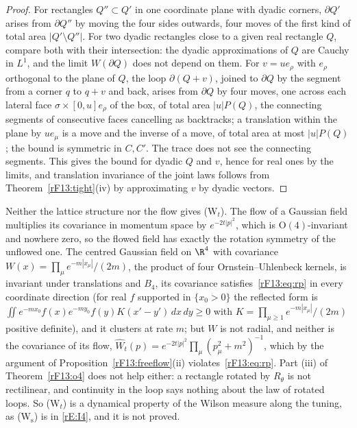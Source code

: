 \begin{proof}
For rectangles $Q''\subset Q'$ in one coordinate plane with dyadic corners,
$\partial Q'$ arises from $\partial Q''$ by moving the four sides outwards,
four moves of the first kind of total area $|Q'\setminus Q''|$. For two
dyadic rectangles close to a given real rectangle $Q$, compare both with
their intersection: the dyadic approximations of $Q$ are Cauchy in $L^1$,
and the limit $W(\partial Q)$ does not depend on them. For $v=ue_\rho$ with
$e_\rho$ orthogonal to the plane of $Q$, the loop $\partial(Q+v)$, joined to
$\partial Q$ by the segment from a corner $q$ to $q+v$ and back, arises from
$\partial Q$ by four moves, one across each lateral face $\sigma\times[0,u]
e_\rho$ of the box, of total area $|u|P(Q)$, the connecting segments of
consecutive faces cancelling as backtracks; a translation within the plane
by $ue_\mu$ is a move and the inverse of a move, of total area at most
$|u|P(Q)$; the bound is symmetric in $C,C'$. The trace does not
see the connecting segments. This gives the bound for dyadic $Q$ and $v$,
hence for real ones by the limits, and translation invariance of the joint
laws follows from Theorem~\ref{rF13:tight}(iv) by approximating $v$ by dyadic
vectors.
\end{proof}

\begin{remark}\label{rF13:o4nogo}
Neither the lattice structure nor the flow gives (W$_t$). The flow of a
Gaussian field multiplies its covariance in momentum space by
$e^{-2t|p|^2}$, which is $\mathrm O(4)$-invariant and nowhere zero, so the
flowed field has exactly the rotation symmetry of the unflowed one. The
centred Gaussian field on $\R^4$ with covariance $W(x)=\prod_\mu e^{-m|x_\mu|}/
(2m)$, the product of four Ornstein--Uhlenbeck kernels, is invariant under
translations and $B_4$, its covariance satisfies~\eqref{rF13:eq:rp} in every
coordinate direction (for real $f$ supported in $\{x_0>0\}$ the reflected
form is $\iint e^{-mx_0}f(x)e^{-my_0}f(y)K(x'-y')\,dx\,dy\ge0$ with
$K=\prod_{\mu\ge1}e^{-m|x_\mu|}/(2m)$ positive definite), and it clusters
at rate $m$; but $W$ is not radial, and neither is the covariance of its
flow, $\hat W_t(p)=e^{-2t|p|^2}\prod_\mu(p_\mu^2+m^2)^{-1}$, which by the
argument of Proposition~\ref{rF13:freeflow}(ii) violates~\eqref{rF13:eq:rp}.
Part (iii) of Theorem~\ref{rF13:o4} does
not help either: a rectangle rotated by $R_\theta$ is not rectilinear, and
continuity in the loop says nothing about the law of rotated loops. So
(W$_t$) is a dynamical property of the Wilson measure along the tuning, as
(W$_{\mathrm s}$) is in \ref{rE:I4}, and it is not proved.
\end{remark}

